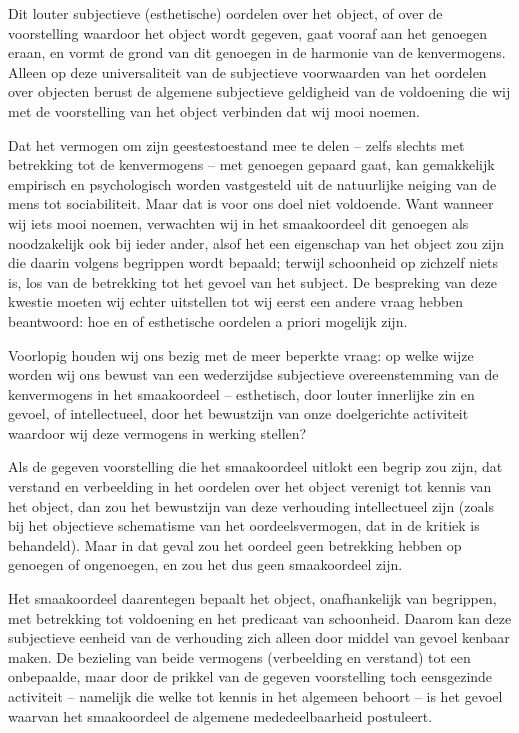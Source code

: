 Dit louter subjectieve (esthetische) oordelen over het object, of over de voorstelling waardoor het object wordt gegeven, gaat vooraf aan het genoegen eraan, en vormt de grond van dit genoegen in de harmonie van de kenvermogens. Alleen op deze universaliteit van de subjectieve voorwaarden van het oordelen over objecten berust de algemene subjectieve geldigheid van de voldoening die wij met de voorstelling van het object verbinden dat wij mooi noemen.

Dat het vermogen om zijn geestestoestand mee te delen – zelfs slechts met betrekking tot de kenvermogens – met genoegen gepaard gaat, kan gemakkelijk empirisch en psychologisch worden vastgesteld uit de natuurlijke neiging van de mens tot sociabiliteit. Maar dat is voor ons doel niet voldoende. Want wanneer wij iets mooi noemen, verwachten wij in het smaakoordeel dit genoegen als noodzakelijk ook bij ieder ander, alsof het een eigenschap van het object zou zijn die daarin volgens begrippen wordt bepaald; terwijl schoonheid op zichzelf niets is, los van de betrekking tot het gevoel van het subject. De bespreking van deze kwestie moeten wij echter uitstellen tot wij eerst een andere vraag hebben beantwoord: hoe en of esthetische oordelen a priori mogelijk zijn.

Voorlopig houden wij ons bezig met de meer beperkte vraag: op welke wijze worden wij ons bewust van een wederzijdse subjectieve overeenstemming van de kenvermogens in het smaakoordeel – esthetisch, door louter innerlijke zin en gevoel, of intellectueel, door het bewustzijn van onze doelgerichte activiteit waardoor wij deze vermogens in werking stellen?

Als de gegeven voorstelling die het smaakoordeel uitlokt een begrip zou zijn, dat verstand en verbeelding in het oordelen over het object verenigt tot kennis van het object, dan zou het bewustzijn van deze verhouding intellectueel zijn (zoals bij het objectieve schematisme van het oordeelsvermogen, dat in de kritiek is behandeld). Maar in dat geval zou het oordeel geen betrekking hebben op genoegen of ongenoegen, en zou het dus geen smaakoordeel zijn.

Het smaakoordeel daarentegen bepaalt het object, onafhankelijk van begrippen, met betrekking tot voldoening en het predicaat van schoonheid. Daarom kan deze subjectieve eenheid van de verhouding zich alleen door middel van gevoel kenbaar maken. De bezieling van beide vermogens (verbeelding en verstand) tot een onbepaalde, maar door de prikkel van de gegeven voorstelling toch eensgezinde activiteit – namelijk die welke tot kennis in het algemeen behoort – is het gevoel waarvan het smaakoordeel de algemene mededeelbaarheid postuleert.

